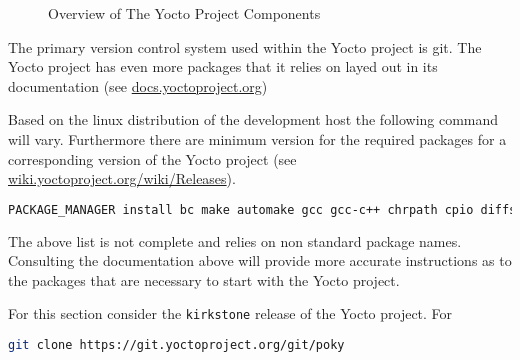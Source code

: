 \begin{figure}[h]
	\caption{Overview of The Yocto Project Components}
	\label{fig:yocto-overview}
\end{figure}

The primary version control system used within the Yocto project is git. The Yocto project has even more packages that it relies on layed out in its documentation (see \href{https://docs.yoctoproject.org/}{docs.yoctoproject.org})

Based on the linux distribution of the development host the following command will vary. Furthermore there are minimum version for the required packages for a corresponding version of the Yocto project (see \href{https://wiki.yoctoproject.org/wiki/Releases}{wiki.yoctoproject.org/wiki/Releases}).

\begin{lstlisting}[language=Bash]
	PACKAGE_MANAGER install bc make automake gcc gcc-c++ chrpath cpio diffstat gawk git python texinfo wget
\end{lstlisting}

The above list is not complete and relies on non standard package names. Consulting the documentation above will provide more accurate instructions as to the packages that are necessary to start with the Yocto project.

For this section consider the \texttt{kirkstone} release of the Yocto project. For

\begin{lstlisting}[language=Bash]
	git clone https://git.yoctoproject.org/git/poky
\end{lstlisting}

